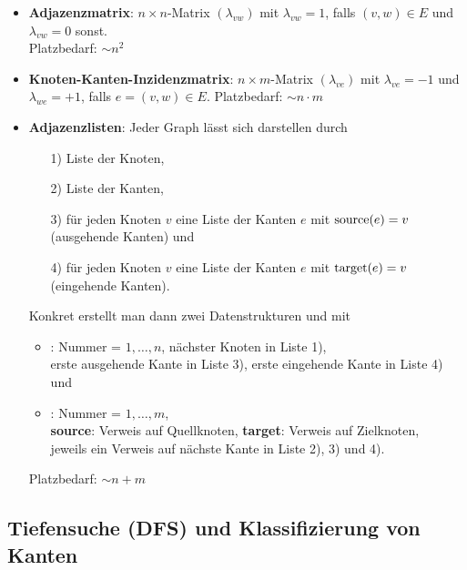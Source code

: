 \begin{itemize}
    \item \textbf{Adjazenzmatrix}:
    $n \times n$-Matrix $(\lambda_{vw})$ mit $\lambda_{vw} = 1$,
    falls $(v, w) \in E$ und $\lambda_{vw} = 0$ sonst. \\
    Platzbedarf: $\sim n^2$

    \item \textbf{Knoten-Kanten-Inzidenzmatrix}:
    $n \times m$-Matrix $(\lambda_{ve})$ mit $\lambda_{ve} = -1$ und
    $\lambda_{we} = +1$, falls $e = (v, w) \in E$.
    Platzbedarf: $\sim n \cdot m$

    \item \textbf{Adjazenzlisten}:
    Jeder Graph lässt sich darstellen durch
    \begin{enumerate}
        \item[1)] Liste der Knoten,

        \item[2)] Liste der Kanten,

        \item[3)] für jeden Knoten $v$ eine Liste der Kanten $e$ mit
        $\operatorname{source}(e) = v$ (ausgehende Kanten) und

        \item[4)] für jeden Knoten $v$ eine Liste der Kanten $e$ mit
        $\operatorname{target}(e) = v$ (eingehende Kanten).
    \end{enumerate}
    Konkret erstellt man dann zwei Datenstrukturen  und
     mit
    \begin{itemize}
        \item \textbf{}:
        Nummer = $1, \dotsc, n$, \quad
        nächster Knoten in Liste 1), \\
        erste ausgehende Kante in Liste 3), \quad
        erste eingehende Kante in Liste 4) und

        \item \textbf{}:
        Nummer = $1, \dotsc, m$, \\
        \textbf{source}: Verweis auf Quellknoten, \quad
        \textbf{target}: Verweis auf Zielknoten, \\
        jeweils ein Verweis auf nächste Kante in Liste 2), 3) und 4).
    \end{itemize}
    Platzbedarf: $\sim n + m$
\end{itemize}

\pagebreak

\subsection{%
    Tiefensuche (DFS) und Klassifizierung von Kanten%
}

